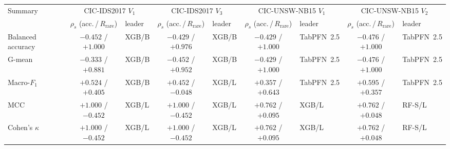 \begin{tabular}{@{}lclclclcl@{}}
\toprule
Summary & \multicolumn{2}{c}{CIC-IDS2017 $V_1$} & \multicolumn{2}{c}{CIC-IDS2017 $V_3$} & \multicolumn{2}{c}{CIC-UNSW-NB15 $V_1$} & \multicolumn{2}{c}{CIC-UNSW-NB15 $V_2$} \\
 & $\rho_s$ (acc.\,/\,$R_{\mathrm{rare}}$) & leader & $\rho_s$ (acc.\,/\,$R_{\mathrm{rare}}$) & leader & $\rho_s$ (acc.\,/\,$R_{\mathrm{rare}}$) & leader & $\rho_s$ (acc.\,/\,$R_{\mathrm{rare}}$) & leader \\
\midrule
Balanced accuracy & $-0.452$ / $+1.000$ & XGB/B & $-0.429$ / $+0.976$ & XGB/B & $-0.429$ / $+1.000$ & TabPFN~2.5 & $-0.476$ / $+1.000$ & TabPFN~2.5 \\
G-mean & $-0.333$ / $+0.881$ & XGB/B & $-0.452$ / $+0.952$ & XGB/B & $-0.429$ / $+1.000$ & TabPFN~2.5 & $-0.476$ / $+1.000$ & TabPFN~2.5 \\
Macro-$F_1$ & $+0.524$ / $+0.405$ & XGB/B & $+0.452$ / $-0.048$ & XGB/L & $+0.357$ / $+0.643$ & TabPFN~2.5 & $+0.595$ / $+0.357$ & TabPFN~2.5 \\
MCC & $+1.000$ / $-0.452$ & XGB/L & $+1.000$ / $-0.452$ & XGB/L & $+0.762$ / $+0.095$ & XGB/L & $+0.762$ / $+0.048$ & RF-S/L \\
Cohen's $\kappa$ & $+1.000$ / $-0.452$ & XGB/L & $+1.000$ / $-0.452$ & XGB/L & $+0.762$ / $+0.095$ & XGB/L & $+0.762$ / $+0.048$ & RF-S/L \\
\bottomrule
\end{tabular}
